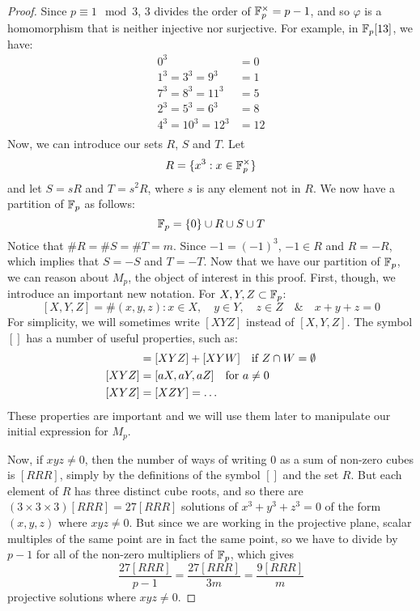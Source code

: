 \begin{proof}
Since $p \equiv 1 \mod{3}$, 3 divides the order of $\mathbb{F}_{p}^{\times} = p-1$, and so $\varphi$ is a homomorphism that is neither injective nor surjective. For example, in $\mathbb{F}_p[13]$, we have:
\begin{align*}
	0^3 &= 0\\
	1^3 = 3^3 = 9^3 &= 1\\
	7^3 = 8^3 = 11^3 &= 5\\
	2^3 = 5^3 = 6^3 &= 8\\
	4^3 = 10^3 = 12^3 &= 12\\
\end{align*}
Now, we can introduce our sets $R$, $S$ and $T$. Let
$$R=\{x^3:x\in \mathbb{F}_{p}^{\times}\}$$
and let $S = sR$ and $T = s^2R$, where $s$ is any element not in $R$. We now have a partition of $\mathbb{F}_p$ as follows:
$$\mathbb{F}_p = \{0\} \cup R \cup S \cup T$$
Notice that $\#R = \#S = \#T = m$. Since $-1=(-1)^3$, $-1 \in R$ and $R = -R$, which implies that $S=-S$ and $T=-T$.
Now that we have our partition of $\mathbb{F}_p$, we can reason about $M_p$, the object of interest in this proof. First, though, we introduce an important new notation. For $X,Y,Z \subset \mathbb{F}_p$:
$$[X,Y,Z] = \#(x,y,z) : x\in X,\quad y\in Y,\quad z\in Z\quad \& \quad x+y+z=0$$
For simplicity, we will sometimes write $[XYZ]$ instead of $[X,Y,Z]$. The symbol $[]$ has a number of useful properties, such as:
\begin{align*}
	[XY(Z\cup W)] &= [XYZ] + [XYW]\quad \si Z\cap W = \emptyset\\
	[XYZ] &= [aX, aY, aZ]\quad \for a\neq0\\
	[XYZ] &= [XZY] = \ldots
\end{align*}
These properties are important and we will use them later to manipulate our initial expression for $M_p$. 

Now, if $xyz\neq0$, then the number of ways of writing $0$ as a sum of non-zero cubes is $[RRR]$, simply by the definitions of the symbol $[]$ and the set $R$. But each element of $R$ has three distinct cube roots, and so there are $(3 \times 3 \times 3) [RRR] = 27[RRR]$ solutions of $x^3 + y^3 + z^3 = 0$ of the form $(x,y,z)$ where $xyz \neq 0$. But since we are working in the projective plane, scalar multiples of the same point are in fact the same point, so we have to divide by $p-1$ for all of the non-zero multipliers of $\mathbb{F}_p$, which gives
$$\frac{27[RRR]}{p-1} = \frac{27[RRR]}{3m} = \frac{9[RRR]}{m}$$
projective solutions where $xyz\neq0$.


\end{proof}
